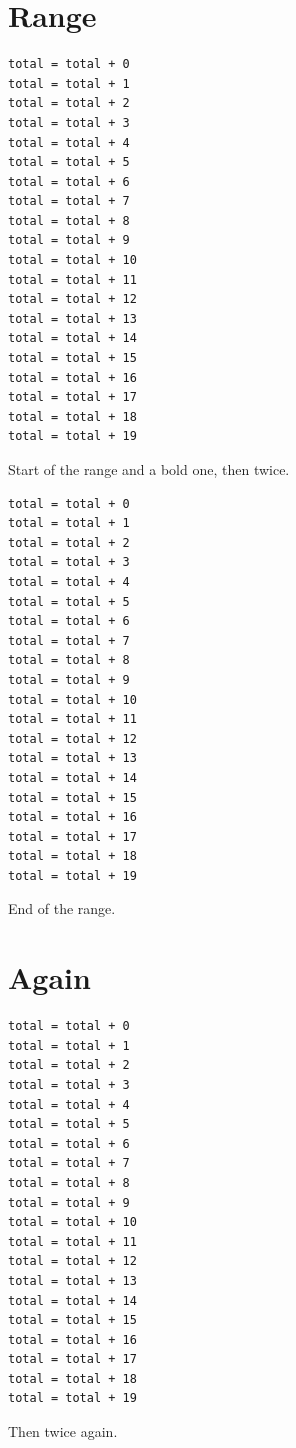 \documentclass{article}
\begin{document}
\section{Range}
\begin{verbatim}
total = total + 0
total = total + 1
total = total + 2
total = total + 3
total = total + 4
total = total + 5
total = total + 6
total = total + 7
total = total + 8
total = total + 9
total = total + 10
total = total + 11
total = total + 12
total = total + 13
total = total + 14
total = total + 15
total = total + 16
total = total + 17
total = total + 18
total = total + 19
\end{verbatim}
Start of the range and a bold one, then twice.
\begin{verbatim}
total = total + 0
total = total + 1
total = total + 2
total = total + 3
total = total + 4
total = total + 5
total = total + 6
total = total + 7
total = total + 8
total = total + 9
total = total + 10
total = total + 11
total = total + 12
total = total + 13
total = total + 14
total = total + 15
total = total + 16
total = total + 17
total = total + 18
total = total + 19
\end{verbatim}
End of the range.
\section{Again}
\begin{verbatim}
total = total + 0
total = total + 1
total = total + 2
total = total + 3
total = total + 4
total = total + 5
total = total + 6
total = total + 7
total = total + 8
total = total + 9
total = total + 10
total = total + 11
total = total + 12
total = total + 13
total = total + 14
total = total + 15
total = total + 16
total = total + 17
total = total + 18
total = total + 19
\end{verbatim}
Then twice again.
\printindex
\end{document}
